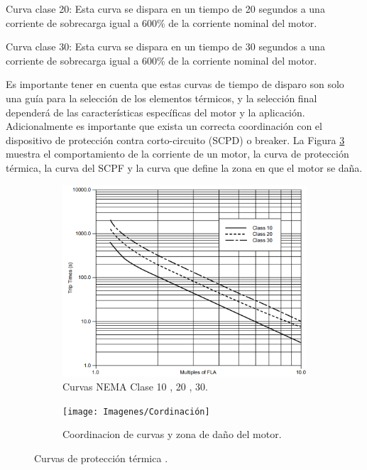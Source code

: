 Curva clase 20: Esta curva se dispara en un tiempo de 20 segundos a una corriente de sobrecarga igual a 600\% de la corriente nominal del motor.

Curva clase 30: Esta curva se dispara en un tiempo de 30 segundos a una corriente de sobrecarga igual a 600\% de la corriente nominal del motor.

Es importante tener en cuenta que estas curvas de tiempo de disparo son solo una guía para la selección de los elementos térmicos, y la selección final dependerá de las características específicas del motor y la aplicación. Adicionalmente es importante que exista un correcta coordinación con el dispositivo de protección contra corto-circuito (SCPD) o breaker. La Figura \ref{fig:cordinacion} muestra el comportamiento de la corriente de un motor, la curva de protección térmica, la curva del SCPF y la curva que define la zona en que el motor se daña.

\begin{figure}
	\centering
	\begin{subfigure}[b]{0.48\textwidth}
		\centering
	\includegraphics[width=\textwidth]{Imagenes/CurvasClass}
	\caption{Curvas NEMA Clase 10 , 20 , 30.}
	\label{fig:curvasclass}
	\end{subfigure}
	\hfill
	\begin{subfigure}[b]{0.5\textwidth}
		\centering
		\texttt{[image: Imagenes/Cordinación]}
		\caption{Coordinacion de curvas y zona de daño del motor.}
		\label{fig:cordinacion}
	\end{subfigure}
	\caption{Curvas de protección térmica \cite{Scheneider}.}
\end{figure}



